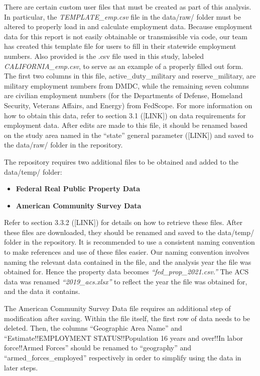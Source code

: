 \documentclass[
]{book}
\providecommand{\tightlist}{%
  \setlength{\itemsep}{0pt}\setlength{\parskip}{0pt}}
\begin{document}
There are certain custom user files that must be created as part of this analysis. In particular, the \emph{TEMPLATE\_emp.csv} file in the data/raw/ folder must be altered to properly load in and calculate employment data. Because employment data for this report is not easily obtainable or transmissible via code, our team has created this template file for users to fill in their statewide employment numbers. Also provided is the .csv file used in this study, labeled \emph{CALIFORNIA\_emp.csv}, to serve as an example of a properly filled out form. The first two columns in this file, active\_duty\_military and reserve\_military, are military employment numbers from DMDC, while the remaining seven columns are civilian employment numbers (for the Departments of Defense, Homeland Security, Veterans Affairs, and Energy) from FedScope. For more information on how to obtain this data, refer to section 3.1 ({[}LINK{]}) on data requirements for employment data. After edits are made to this file, it should be renamed based on the study area named in the ``state'' general parameter ({[}LINK{]}) and saved to the data/raw/ folder in the repository.

The repository requires two additional files to be obtained and added to the data/temp/ folder:

\begin{itemize}
\tightlist
\item
  \textbf{Federal Real Public Property Data}
\item
  \textbf{American Community Survey Data}
\end{itemize}

Refer to section 3.3.2 ({[}LINK{]}) for details on how to retrieve these files. After these files are downloaded, they should be renamed and saved to the data/temp/ folder in the repository. It is recommended to use a consistent naming convention to make references and use of these files easier. Our naming convention involves naming the relevant data contained in the file, and the analysis year the file was obtained for. Hence the property data becomes \emph{``fed\_prop\_2021.csv.''} The ACS data was renamed \emph{``2019\_acs.xlsx''} to reflect the year the file was obtained for, and the data it contains.

The American Community Survey Data file requires an additional step of modification after saving. Within the file itself, the first row of data needs to be deleted. Then, the columns ``Geographic Area Name'' and ``Estimate!!EMPLOYMENT STATUS!!Population 16 years and over!!In labor force!!Armed Forces'' should be renamed to ``geography'' and ``armed\_forces\_employed'' respectively in order to simplify using the data in later steps.
\end{document}
